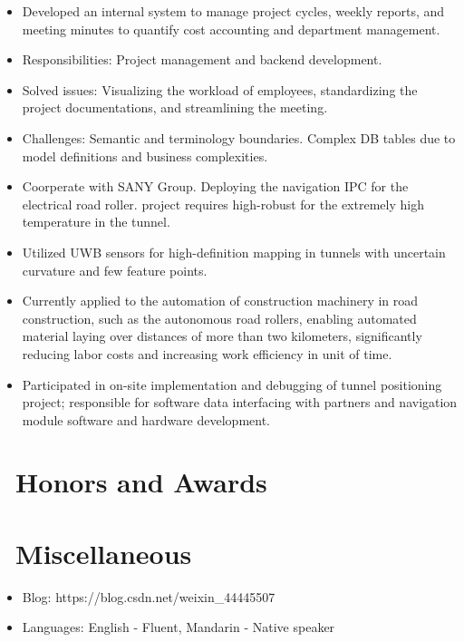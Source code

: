 \documentclass[a4paper,10pt]{resume}
\begin{document}
\begin{itemize}[parsep=0.5ex]
  \item Developed an internal system to manage project cycles, weekly reports, and meeting minutes to quantify cost accounting and department management.
  \item Responsibilities: Project management and backend development.
  \item Solved issues: Visualizing the workload of employees, standardizing the project documentations, and streamlining the meeting.
  \item Challenges: Semantic and terminology boundaries. Complex DB tables due to model definitions and business complexities.
\end{itemize}

\begin{itemize}[parsep=0.5ex]
  \item Coorperate with SANY Group. Deploying the navigation IPC for the electrical road roller. project requires high-robust for the extremely high temperature in the tunnel.
  \item Utilized UWB sensors for high-definition mapping in tunnels with uncertain curvature and few feature points.
  \item Currently applied to the automation of construction machinery in road construction, such as the autonomous road rollers, enabling automated material laying over distances of more than two kilometers, significantly reducing labor costs and increasing work efficiency in unit of time.
  \item Participated in on-site implementation and debugging of tunnel positioning project; responsible for software data interfacing with partners and navigation module software and hardware development.
\end{itemize}

\section{\faHeartO\ Honors and Awards}

\section{\faInfo\ Miscellaneous}
\begin{itemize}[parsep=0.5ex]
  \item Blog: https://blog.csdn.net/weixin\_44445507
  \item Languages: English - Fluent, Mandarin - Native speaker
\end{itemize}

%
%
\end{document}
